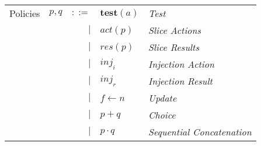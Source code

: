 \documentclass[12pt, letterpaper]{article}
\begin{document}
  \begin{tabular}{l c r l l}
    Policies  & $p,q$ & $::=$  & $\mathbf{test}(a)$ & \textit{Test}     \\
              &       & $\mid$ & $act(p)$           & \textit{Slice Actions}    \\
              &       & $\mid$ & $res(p)$           & \textit{Slice Results}    \\
              &       & $\mid$ & $inj_{i}$          & \textit{Injection Action} \\
              &       & $\mid$ & $inj_{r}$          & \textit{Injection Result} \\
              &       & $\mid$ & $f \leftarrow n$   & \textit{Update}   \\
              &       & $\mid$ & $p + q$            & \textit{Choice}   \\
              &       & $\mid$ & $p \cdot q$        & \textit{Sequential Concatenation} \\
  \end{tabular}\\


\newpage
\end{document}
